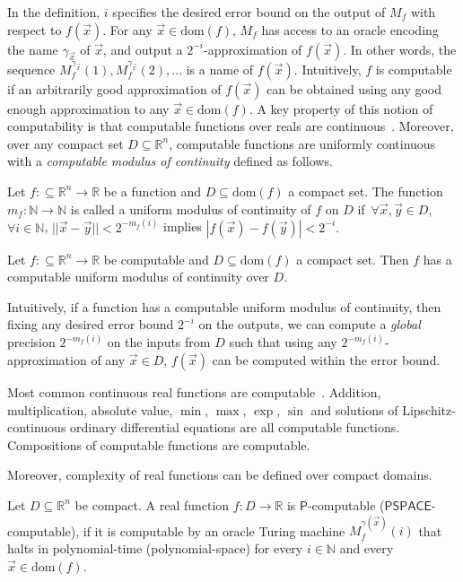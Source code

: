 \documentclass[envcountsect]{llncs}
\newcommand{\dom}{\mathrm{dom}}
\begin{document}
In the definition, $i$ specifies the desired error bound on the output of $M_f$ with respect to $f(\vec x)$. For any $\vec x\in \dom(f)$, $M_f$ has access to an oracle encoding the name $\gamma_{\vec x}$ of $\vec x$, and output a $2^{-i}$-approximation of $f(\vec x)$. In other words, the sequence $M_f^{\gamma_{\vec x}}(1), M_f^{\gamma_{\vec x}}(2), ...$ is a name of $f(\vec x)$. Intuitively, $f$ is computable if an arbitrarily good approximation of $f(\vec x)$ can be obtained using any good enough approximation to any $\vec x\in\dom(f)$. A key property of this notion of computability is that computable functions over reals are continuous~\cite{CAbook}. Moreover, over any compact set $D\subseteq \mathbb{R}^n$, computable functions are uniformly continuous with a {\em computable modulus of continuity} defined as follows. 
\begin{definition}
Let $f:\subseteq \mathbb{R}^n\rightarrow \mathbb{R}$ be a function and $D\subseteq\dom(f)$ a compact set. The function $m_f: \mathbb{N}\rightarrow \mathbb{N}$ is called a uniform modulus of continuity of $f$ on $D$ if\ $\forall \vec x,\vec y\in D$, $\forall i\in \mathbb{N}$, $||\vec x-\vec y||<2^{-m_f(i)}$ implies $|f(\vec x)-f(\vec y)|<2^{-i}.$
\end{definition}
\begin{proposition}
Let $f:\subseteq\mathbb{R}^n\rightarrow \mathbb{R}$ be computable and $D\subseteq\dom(f)$ a compact set. Then $f$ has a computable uniform modulus of continuity over $D$.
\end{proposition}
Intuitively, if a function has a computable uniform modulus of continuity, then fixing any desired error bound $2^{-i}$ on the outputs, we can compute a {\em global} precision $2^{-m_f(i)}$ on the inputs from $D$ such that using any $2^{-m_f(i)}$-approximation of any $\vec x\in D$, $f(\vec x)$ can be computed within the error bound. 

Most common continuous real functions are computable~\cite{CAbook}. Addition, multiplication, absolute value, $\min$, $\max$, $\exp$, $\sin$ and solutions of Lipschitz-continuous ordinary differential equations are all computable functions. Compositions of computable functions are computable.

Moreover, complexity of real functions can be defined over compact domains. 
\begin{definition}[\cite{Ko92}]
Let $D\subseteq \mathbb{R}^n$ be compact. A real function $f:D\rightarrow\mathbb{R}$ is $\mathsf{P}$-computable ($\mathsf{PSPACE}$-computable), if it is computable by an oracle Turing machine $M_{f}^{\gamma(\vec x)}(i)$ that halts in polynomial-time (polynomial-space) for every $i\in \mathbb{N}$ and every $\vec x\in \dom(f)$. 
\end{definition}
\end{document}
